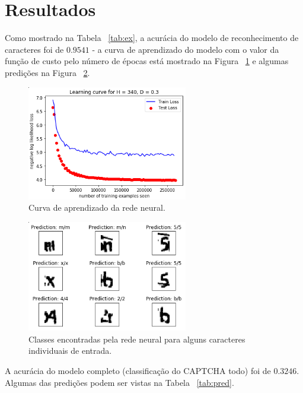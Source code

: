 \documentclass[11pt]{article}
\begin{document}
\section{Resultados}

Como mostrado na Tabela ~\ref{tab:ex}, a acurácia do modelo de reconhecimento de caracteres foi de $0.9541$ - a curva de aprendizado do modelo com o valor da função de custo pelo número de épocas está mostrado na Figura ~\ref{fig:learning} e algumas predições na Figura ~\ref{fig:pred}.

  \begin{figure}[H]
        {\centering
        \includegraphics[width=70mm]{images/learning.png}
        \caption{Curva de aprendizado da rede neural.}
        \label{fig:learning}\par}
  \end{figure}

  \begin{figure}[H]
        {\centering
        \includegraphics[width=70mm]{images/pred.png}
        \caption{Classes encontradas pela rede neural para alguns caracteres individuais de entrada.}
        \label{fig:pred}\par}
\end{figure}

A acurácia do modelo completo (classificação do CAPTCHA todo) foi de $0.3246$. Algumas das predições podem ser vistas na Tabela ~\ref{tab:pred}.
\end{document}
